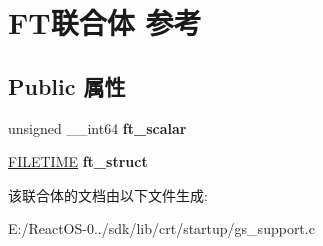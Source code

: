 \hypertarget{union_f_t}{}\section{F\+T联合体 参考}
\label{union_f_t}
\subsection*{Public 属性}
\begin{DoxyCompactItemize}
\item 
\mbox{\label{union_f_t_ab2e19353497820f522213117a4250d15}} 
unsigned \+\_\+\+\_\+int64 {\bfseries ft\+\_\+scalar}
\item 
\mbox{\label{union_f_t_af66576a17afedfa62b5c70a6c8a201d7}} 
\hyperlink{struct___f_i_l_e_t_i_m_e}{F\+I\+L\+E\+T\+I\+ME} {\bfseries ft\+\_\+struct}
\end{DoxyCompactItemize}


该联合体的文档由以下文件生成\+:\begin{DoxyCompactItemize}
\item 
E\+:/\+React\+O\+S-\/0../sdk/lib/crt/startup/gs\+\_\+support.\+c\end{DoxyCompactItemize}
